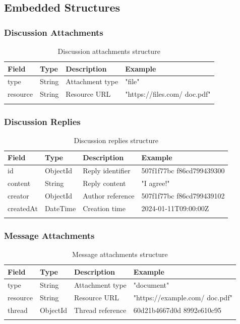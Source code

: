 \subsection{Embedded Structures}

\subsubsection{Discussion Attachments}
\begin{longtable}{|C{2.5cm}|C{1.8cm}|C{4cm}|C{4cm}|}
\hline
\textbf{Field} & \textbf{Type} & \textbf{Description} & \textbf{Example} \\ \hline
\endhead

type & String & Attachment type & "file" \\ \hline
resource & String & Resource URL & "https://files.com/ doc.pdf" \\ \hline

\caption{Discussion attachments structure}
\label{tab:discussion_attachments}
\end{longtable}

\subsubsection{Discussion Replies}
\begin{longtable}{|C{2.5cm}|C{1.8cm}|C{4cm}|C{3cm}|}
\hline
\textbf{Field} & \textbf{Type} & \textbf{Description} & \textbf{Example} \\ \hline
\endhead

id & ObjectId & Reply identifier & 507f1f77bc f86cd799439300 \\ \hline
content & String & Reply content & "I agree!" \\ \hline
creator & ObjectId & Author reference & 507f1f77bc f86cd799439102 \\ \hline
createdAt & DateTime & Creation time & 2024-01-11T09:00:00Z \\ \hline

\caption{Discussion replies structure}
\label{tab:discussion_replies}
\end{longtable}

\subsubsection{Message Attachments}
\begin{longtable}{|C{2.5cm}|C{1.8cm}|C{4cm}|C{4.3cm}|}
\hline
\textbf{Field} & \textbf{Type} & \textbf{Description} & \textbf{Example} \\ \hline
\endhead

type & String & Attachment type & "document" \\ \hline
resource & String & Resource URL & "https://example.com/ doc.pdf" \\ \hline
thread & ObjectId & Thread reference & 60d21b4667d0d 8992e610c95 \\ \hline

\caption{Message attachments structure}
\label{tab:message_attachments}
\end{longtable}


